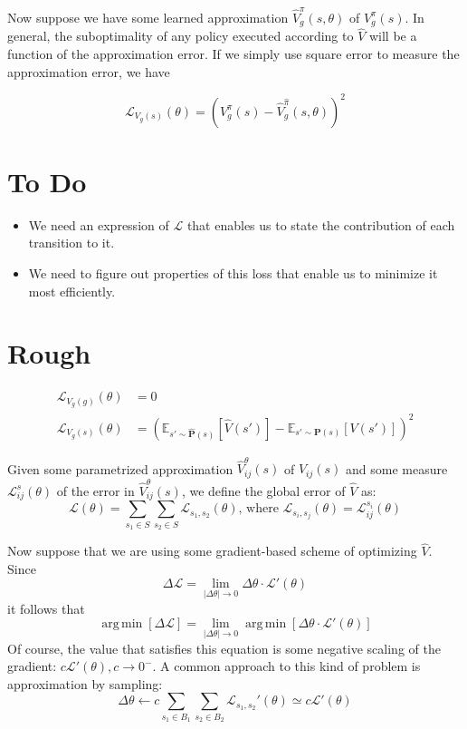 \documentclass{article}
\DeclareMathOperator*{\argmin}{arg\,min}
\begin{document}
Now suppose we have some learned approximation $\hat{V}_{g}^\pi(s, \theta)$ of $V_{g}^\pi(s)$. In general, the suboptimality of any policy executed according to $\hat{V}$ will be a function of the approximation error. If we simply use square error to measure the approximation error, we have

\[
   \mathcal{L}_{V_g(s)}(\theta) = {({V_g^\pi(s) - \hat{V}_{g}^{\hat{\pi}}(s, \theta)})}^2
\]

\section{To Do}
\begin{itemize}
\item We need an expression of $\mathcal{L}$ that enables us to state the contribution of each transition to it.
\item We need to figure out properties of this loss that enable us to minimize it most efficiently.
\end{itemize}

\section{Rough}

\begin{align}
   \mathcal{L}_{V_g(g)}(\theta) &= 0 \\
   \mathcal{L}_{V_g(s)}(\theta) &= {({\mathbb{E}_{s' \sim \bm{\hat{P}}(s)} {[{\hat{V}(s')}]}} - {\mathbb{E}_{s' \sim \bm{P}(s)} {[{V(s')}]}})}^2
 \end{align}

Given some parametrized approximation $\hat{V}_{ij}^{\theta}(s)$ of $V_{ij}(s)$ and some measure $\mathcal{L}_{ij}^s(\theta)$ of the error in $\hat{V}_{ij}^{\theta}(s)$, we define the global error of $\hat{V}$ as:
\[
   \mathcal{L}(\theta) = \sum_{s_1 \in S}\sum_{s_2 \in S}\mathcal{L}_{s_1,s_2}(\theta)
\text{, where }
   \mathcal{L}_{s_i, s_j}(\theta) = \mathcal{L}_{ij}^{s_i}(\theta)
\]


Now suppose that we are using some gradient-based scheme of optimizing $\hat{V}$. Since 
\[
  \Delta \mathcal{L} = \lim_{|\Delta \theta| \to 0}\Delta \theta \cdot \mathcal{L}'(\theta)
\]
it follows that
\[
  \argmin \left[ \Delta \mathcal{L} \right] = \lim_{|\Delta \theta| \to 0}\argmin \left[ \Delta \theta \cdot \mathcal{L}'(\theta) \right]
\]
Of course, the value that satisfies this equation is some negative scaling of the gradient: $c\mathcal{L}'(\theta), c \to 0^-$. A common approach to this kind of problem is approximation by sampling:
\[
  \Delta \theta \leftarrow c\sum_{s_1 \in B_1}\sum_{s_2 \in B_2}\mathcal{L}_{s_1,s_2}'(\theta) \simeq c\mathcal{L}'(\theta)
\]
\end{document}
